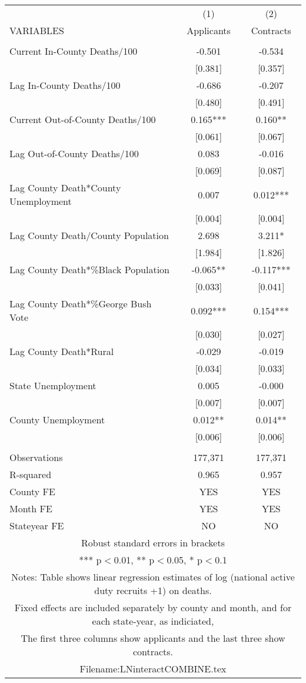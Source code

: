 \documentclass[]{article}
\begin{document}
\begin{tabular}{lcc} \hline
 & (1) & (2) \\
VARIABLES & Applicants & Contracts \\ \hline
 &  &  \\
Current In-County Deaths/100 & -0.501 & -0.534 \\
 & [0.381] & [0.357] \\
Lag In-County Deaths/100 & -0.686 & -0.207 \\
 & [0.480] & [0.491] \\
Current Out-of-County Deaths/100 & 0.165*** & 0.160** \\
 & [0.061] & [0.067] \\
Lag Out-of-County Deaths/100 & 0.083 & -0.016 \\
 & [0.069] & [0.087] \\
Lag County Death*County Unemployment & 0.007 & 0.012*** \\
 & [0.004] & [0.004] \\
Lag County Death/County Population & 2.698 & 3.211* \\
 & [1.984] & [1.826] \\
Lag County Death*\%Black Population & -0.065** & -0.117*** \\
 & [0.033] & [0.041] \\
Lag County Death*\%George Bush Vote & 0.092*** & 0.154*** \\
 & [0.030] & [0.027] \\
Lag County Death*Rural & -0.029 & -0.019 \\
 & [0.034] & [0.033] \\
State Unemployment & 0.005 & -0.000 \\
 & [0.007] & [0.007] \\
County Unemployment & 0.012** & 0.014** \\
 & [0.006] & [0.006] \\
 &  &  \\
Observations & 177,371 & 177,371 \\
R-squared & 0.965 & 0.957 \\
County FE & YES & YES \\
Month FE & YES & YES \\
 Stateyear FE & NO & NO \\ \hline
\multicolumn{3}{c}{ Robust standard errors in brackets} \\
\multicolumn{3}{c}{ *** p$<$0.01, ** p$<$0.05, * p$<$0.1} \\
\multicolumn{3}{c}{ Notes: Table shows linear regression estimates of log (national active duty recruits +1) on deaths.} \\
\multicolumn{3}{c}{ Fixed effects are included separately by county and month, and for each state-year, as indiciated,} \\
\multicolumn{3}{c}{ The first three columns show applicants and the last three show contracts.} \\
\multicolumn{3}{c}{ Filename:LNinteractCOMBINE.tex} \\
\end{tabular}
\end{document}
